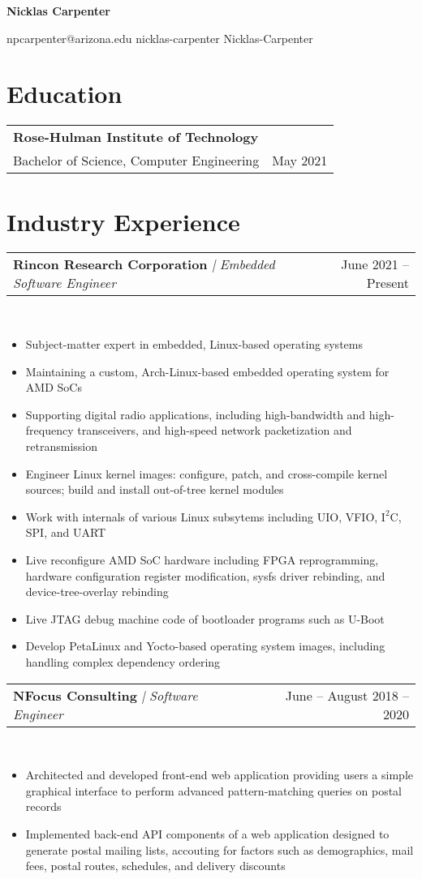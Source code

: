 \documentclass{article}
\makeatletter
\newcommand{\vsep}{{\large\emph{|}}}
\newcommand{\cvbullet}{\item[\(\circ\)]}
\newcommand{\socialicon}[1]{{\raisebox{-0.05em}{\resizebox{!}{0.8em}{#1}}}}
\newcommand{\cvlinkedin}[1]{\href{https://www.linkedin.com/in/#1}{\socialicon{\faLinkedin}}\hspace{0.75ex}#1}
\newcommand{\cvgithub}[1]{\href{https://github.com/#1}{\socialicon{\faGithub}}\hspace{0.75ex}#1}
\newcommand{\cvemail}[1]{\href{mailto:#1}{\faEnvelope}\hspace{0.75ex}#1}
\newenvironment{cvsection}[1]
	{\section{#1}\begin{description}[leftmargin=*,labelsep=1mm]}
	{\vspace{0.25em}\end{description}}
\newenvironment{cvjob}[3]{
	\item\begin{tabular*}{0.98\textwidth}[t]{l@{\extracolsep{\fill}}r}
		\textbf{#1} {\vsep} {\small\textit{#2}} & {\footnotesize#3}
	\end{tabular*}\\
	\begin{minipage}[b]{0.66\textwidth}
		\vspace{0.33em}
		\begin{flushleft}
		\begin{itemize}
		\addtolength{\itemsep}{-0.5em}

}{\end{itemize}\end{flushleft}\end{minipage}\vspace{-0.25em}}
\newcommand{\cvdegree}[4] {
	\item\begin{tabular*}{0.98\textwidth}[t]{l@{\extracolsep{\fill}}r}
		\textbf{#1} \\
		{\small{#2}}, {\small{#3}} & {\footnotesize{#4}}
	\end{tabular*}
}
\newcommand{\headerfontviii}{\fontfamily{qpl}\selectfont} 	%
\makeatother
\begin{document}
\headerfontviii

\begin{center}
	{\Huge\textbf{Nicklas Carpenter}}\\
\end{center}
\begin{center}
	\small{\cvemail{npcarpenter@arizona.edu}
		\hspace{1em}{\vsep}\hspace{1em} \cvlinkedin{nicklas-carpenter}
		\hspace{1em}{\vsep}\hspace{1em} \cvgithub{Nicklas-Carpenter}
	}\\
	\vspace{0.5em}
\end{center}

\begin{cvsection}{Education}
	\cvdegree{Rose-Hulman Institute of Technology}{Bachelor of Science}{Computer Engineering}{May 2021}
\end{cvsection}

\begin{cvsection}{Industry Experience}
	\begin{cvjob}{Rincon Research Corporation}{Embedded Software Engineer}{June 2021 -- Present}
		\cvbullet Subject-matter expert in embedded, Linux-based operating systems
		\cvbullet Maintaining a custom, Arch-Linux-based embedded operating system for AMD SoCs
		\cvbullet Supporting digital radio applications, including high-bandwidth and
			high-frequency transceivers, and high-speed network packetization and
			retransmission
		\cvbullet Engineer Linux kernel images: configure, patch,
			and cross-compile kernel sources; build and install out-of-tree kernel modules
		\cvbullet Work with internals of various Linux subsytems including UIO, VFIO, $\textrm{I}^2$C, SPI,
			and UART
		\cvbullet Live reconfigure AMD SoC hardware including
			FPGA reprogramming, hardware configuration register modification, sysfs driver
			rebinding, and device-tree-overlay rebinding
		\cvbullet Live JTAG debug machine code of bootloader programs such as U-Boot
		\cvbullet Develop PetaLinux and Yocto-based operating system images,
			including handling complex dependency ordering

	\end{cvjob}
	\begin{cvjob}{NFocus Consulting}{Software Engineer}{June -- August 2018 -- 2020}
		\cvbullet Architected and developed front-end web application providing users a
			simple graphical interface to perform advanced pattern-matching queries
			on postal records
		\cvbullet Implemented back-end API components of a web application designed to generate
			postal mailing lists, accouting for factors such as demographics, mail fees,
			postal routes, schedules, and delivery discounts
	\end{cvjob}
\end{cvsection}
\end{document}
